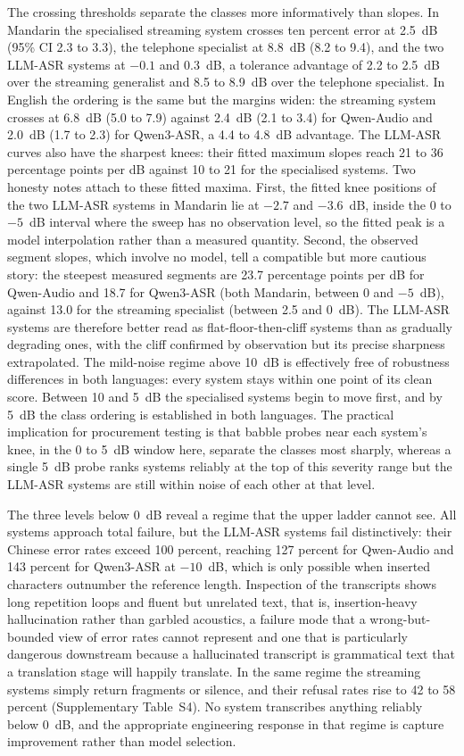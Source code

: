 The crossing thresholds separate the classes more informatively than
slopes. In Mandarin the specialised streaming system crosses ten percent
error at 2.5~dB (95\% CI 2.3 to 3.3), the telephone specialist at 8.8~dB
(8.2 to 9.4), and the two LLM-ASR systems at $-0.1$ and 0.3~dB, a tolerance
advantage of 2.2 to 2.5~dB over the streaming generalist and 8.5 to 8.9~dB
over the telephone specialist. In English the ordering is the same but the
margins widen: the streaming system crosses at 6.8~dB (5.0 to 7.9) against
2.4~dB (2.1 to 3.4) for Qwen-Audio and 2.0~dB (1.7 to 2.3) for Qwen3-ASR,
a 4.4 to 4.8~dB advantage. The LLM-ASR curves also have the sharpest knees:
their fitted maximum slopes reach 21 to 36 percentage points per dB
against 10 to 21 for the specialised systems. Two honesty notes attach to
these fitted maxima. First, the fitted knee positions of the two LLM-ASR
systems in Mandarin lie at $-2.7$ and $-3.6$~dB, inside the 0 to $-5$~dB
interval where the sweep has no observation level, so the fitted peak is a
model interpolation rather than a measured quantity. Second, the observed
segment slopes, which involve no model, tell a compatible but more
cautious story: the steepest measured segments are 23.7 percentage points
per dB for Qwen-Audio and 18.7 for Qwen3-ASR (both Mandarin, between 0 and
$-5$~dB), against 13.0 for the streaming specialist (between 2.5 and
0~dB). The LLM-ASR systems are therefore better read as
flat-floor-then-cliff systems than as gradually degrading ones, with the
cliff confirmed by observation but its precise sharpness extrapolated. The
mild-noise
regime above 10~dB is effectively free of robustness differences in both
languages: every system stays within one point of its clean score. Between
10 and 5~dB the specialised systems begin to move first, and by 5~dB the
class ordering is established in both languages. The practical implication
for procurement testing is that babble probes near each system's knee, in
the 0 to 5~dB window here, separate the classes most sharply, whereas a
single 5~dB probe ranks systems reliably at the top of this severity range
but the LLM-ASR systems are still within noise of each other at that level.

The three levels below 0~dB reveal a regime that the
upper ladder cannot see. All systems approach total
failure, but the LLM-ASR systems fail distinctively: their Chinese error
rates exceed 100 percent, reaching 127 percent for Qwen-Audio and 143
percent for Qwen3-ASR at $-10$~dB, which is only possible when inserted
characters outnumber the reference length. Inspection of the transcripts
shows long repetition loops and fluent but unrelated text, that is,
insertion-heavy hallucination rather than garbled acoustics, a failure mode
that a wrong-but-bounded view of error rates cannot represent and one that
is particularly dangerous downstream because a hallucinated transcript is
grammatical text that a translation stage will happily translate. In the
same regime the streaming systems simply return fragments or silence, and
their refusal rates rise to 42 to 58 percent (Supplementary Table~S4).
No system transcribes anything reliably below 0~dB, and the appropriate
engineering response in that regime is capture improvement rather than
model selection.

